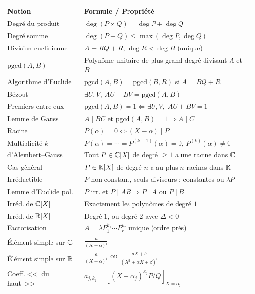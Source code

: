 \begin{center}
\renewcommand{\arraystretch}{1.4}
\begin{tabular}{|l|l|}
\hline
\textbf{Notion} & \textbf{Formule / Propriété} \\
\hline
Degré du produit & $\deg(P \times Q) = \deg P + \deg Q$ \\
Degré somme & $\deg(P + Q) \leqslant \max(\deg P, \deg Q)$ \\
Division euclidienne & $A = BQ + R$, \; $\deg R < \deg B$ (unique) \\
$\text{pgcd}(A, B)$ & Polynôme unitaire de plus grand degré divisant $A$ et $B$ \\
Algorithme d'Euclide & $\text{pgcd}(A, B) = \text{pgcd}(B, R)$ si $A = BQ + R$ \\
Bézout & $\exists U, V,\; AU + BV = \text{pgcd}(A, B)$ \\
Premiers entre eux & $\text{pgcd}(A, B) = 1 \iff \exists U, V,\; AU + BV = 1$ \\
Lemme de Gauss & $A \mid BC$ et $\text{pgcd}(A, B) = 1 \Rightarrow A \mid C$ \\
Racine & $P(\alpha) = 0 \iff (X - \alpha) \mid P$ \\
Multiplicité $k$ & $P(\alpha) = \cdots = P^{(k-1)}(\alpha) = 0$, $P^{(k)}(\alpha) \neq 0$ \\
d'Alembert--Gauss & Tout $P \in \mathbb{C}[X]$ de degré $\geqslant 1$ a une racine dans $\mathbb{C}$ \\
Cas général & $P \in \mathbb{K}[X]$ de degré $n$ a au plus $n$ racines dans $\mathbb{K}$ \\
Irréductible & $P$ non constant, seuls diviseurs : constantes ou $\lambda P$ \\
Lemme d'Euclide pol. & $P$ irr. et $P \mid AB \Rightarrow P \mid A$ ou $P \mid B$ \\
Irréd. de $\mathbb{C}[X]$ & Exactement les polynômes de degré $1$ \\
Irréd. de $\mathbb{R}[X]$ & Degré $1$, ou degré $2$ avec $\Delta < 0$ \\
Factorisation & $A = \lambda P_1^{k_1} \cdots P_r^{k_r}$ unique (ordre près) \\
Élément simple sur $\mathbb{C}$ & $\frac{a}{(X - \alpha)^i}$ \\
Élément simple sur $\mathbb{R}$ & $\frac{a}{(X - \alpha)^i}$ ou $\frac{aX + b}{(X^2 + \alpha X + \beta)^i}$ \\
Coeff. <<~du haut~>> & $a_{j,k_j} = [(X - \alpha_j)^{k_j} P/Q]_{X = \alpha_j}$ \\
\hline
\end{tabular}
\end{center}

